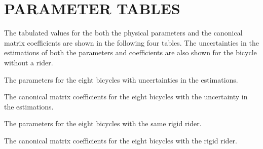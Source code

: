 \documentclass{bmd2010p}
\begin{document}
\section{PARAMETER TABLES}
\label{sec:partables}
The tabulated values for the both the physical parameters and the canonical matrix
coefficients are shown in the following four tables. The uncertainties in the
estimations of both the parameters and coefficients are also shown for the
bicycle without a rider.
%
\begin{landscape}

\begin{table}[tb]
\caption{The parameters for the eight bicycles with uncertainties in the
estimations.}

\label{tab:bicyclePar}
\end{table}

\begin{table}[tb]
\caption{The canonical matrix coefficients for the eight bicycles with the
uncertainty in the estimations.}

\label{tab:bicycleCan}
\end{table}

\begin{table}[tb]
\caption{The parameters for the eight bicycles with the same rigid rider.}

\label{tab:bicycleRiderPar}
\end{table}

\begin{table}[tb]
\caption{The canonical matrix coefficients for the eight bicycles with the
rigid rider.}

\label{tab:bicycleRiderCan}
\end{table}

\end{landscape}
\end{document}
